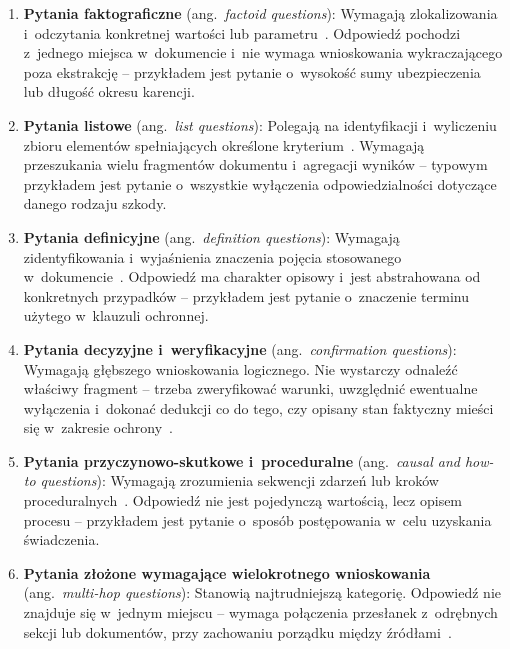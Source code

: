 \begin{enumerate}
  \item \textbf{Pytania faktograficzne} (ang.~\textit{factoid questions}):
        Wymagają zlokalizowania i~odczytania konkretnej wartości lub parametru~\cite{mishra2016survey}.
        Odpowiedź pochodzi z~jednego miejsca w~dokumencie i~nie wymaga
        wnioskowania wykraczającego poza ekstrakcję -- przykładem jest pytanie
        o~wysokość sumy ubezpieczenia lub długość okresu karencji.

  \item \textbf{Pytania listowe} (ang.~\textit{list questions}):
        Polegają na identyfikacji i~wyliczeniu zbioru elementów spełniających
        określone kryterium~\cite{mishra2016survey}. Wymagają przeszukania wielu fragmentów dokumentu
        i~agregacji wyników -- typowym przykładem jest pytanie o~wszystkie
        wyłączenia odpowiedzialności dotyczące danego rodzaju szkody.

  \item \textbf{Pytania definicyjne} (ang.~\textit{definition questions}):
        Wymagają zidentyfikowania i~wyjaśnienia znaczenia pojęcia stosowanego
        w~dokumencie~\cite{mishra2016survey}. Odpowiedź ma charakter opisowy i~jest abstrahowana od
        konkretnych przypadków -- przykładem jest pytanie o~znaczenie terminu
        użytego w~klauzuli ochronnej.

  \item \textbf{Pytania decyzyjne i~weryfikacyjne}
        (ang.~\textit{confirmation questions}): Wymagają głębszego wnioskowania
        logicznego. Nie wystarczy odnaleźć właściwy fragment -- trzeba
        zweryfikować warunki, uwzględnić ewentualne wyłączenia i~dokonać
        dedukcji co do tego, czy opisany stan faktyczny mieści się w~zakresie
        ochrony~\cite{koreeda2021contractnli}.

  \item \textbf{Pytania przyczynowo-skutkowe i~proceduralne}
        (ang.~\textit{causal and how-to questions}): Wymagają zrozumienia
        sekwencji zdarzeń lub kroków proceduralnych~\cite{mishra2016survey}. Odpowiedź nie jest
        pojedynczą wartością, lecz opisem procesu -- przykładem jest pytanie
        o~sposób postępowania w~celu uzyskania świadczenia.

  \item \textbf{Pytania złożone wymagające wielokrotnego wnioskowania}
        (ang.~\textit{multi-hop questions}): Stanowią najtrudniejszą kategorię.
        Odpowiedź nie znajduje się w~jednym miejscu -- wymaga połączenia
        przesłanek z~odrębnych sekcji lub dokumentów, przy zachowaniu porządku
        między źródłami~\cite{yang2018hotpotqa}.
\end{enumerate}


